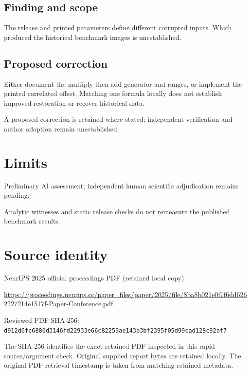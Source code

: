 \documentclass[11pt]{article}
\begin{document}
\subsection*{Finding and scope}

The release and printed parameters define different corrupted inputs. Which produced the historical benchmark images is unestablished.

\subsection*{Proposed correction}

Either document the multiply-then-add generator and ranges, or implement the printed correlated offset. Matching one formula locally does not establish improved restoration or recover historical data.

A proposed correction is retained where stated; independent verification and author adoption remain unestablished.

\section*{Limits}

Preliminary AI assessment; independent human scientific adjudication remains pending.\par

Analytic witnesses and static release checks do not remeasure the published benchmark results.\par

\section*{Source identity}

NeurIPS 2025 official proceedings PDF (retained local copy)

\url{https://proceedings.neurips.cc/paper_files/paper/2025/file/8ba8b021e0f7f6dd6262227214e1517f-Paper-Conference.pdf}

Reviewed PDF SHA-256: \nolinkurl{d912d6fc6880d3146fd22933e66c82259ae143b3bf2395f05d99cad128c92af7}

The SHA-256 identifies the exact retained PDF inspected in this rapid source/argument check. Original supplied report bytes are retained locally. The original PDF retrieval timestamp is taken from matching retained metadata.
\end{document}
